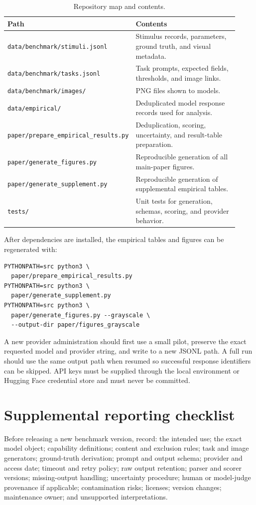 \documentclass[11pt]{article}
\begin{document}
\begin{table}[H]
\centering
\scriptsize
\caption{Repository map and contents.}
\label{tab:supp-repository-map}
\begin{tabular}{p{0.43\linewidth}p{0.49\linewidth}}
\toprule
Path & Contents \\
\midrule
\texttt{data/benchmark/stimuli.jsonl} & Stimulus records, parameters, ground truth, and visual metadata. \\
\texttt{data/benchmark/tasks.jsonl} & Task prompts, expected fields, thresholds, and image links. \\
\texttt{data/benchmark/images/} & PNG files shown to models. \\
\texttt{data/empirical/} & Deduplicated model response records used for analysis. \\
\texttt{paper/prepare\_empirical\_results.py} & Deduplication, scoring, uncertainty, and result-table preparation. \\
\texttt{paper/generate\_figures.py} & Reproducible generation of all main-paper figures. \\
\texttt{paper/generate\_supplement.py} & Reproducible generation of supplemental empirical tables. \\
\texttt{tests/} & Unit tests for generation, schemas, scoring, and provider behavior. \\
\bottomrule
\end{tabular}
\end{table}

After dependencies are installed, the empirical tables and figures can be regenerated with:

\begin{verbatim}
PYTHONPATH=src python3 \
  paper/prepare_empirical_results.py
PYTHONPATH=src python3 \
  paper/generate_supplement.py
PYTHONPATH=src python3 \
  paper/generate_figures.py --grayscale \
  --output-dir paper/figures_grayscale
\end{verbatim}

A new provider administration should first use a small pilot, preserve the exact requested model and provider string, and write to a new JSONL path. A full run should use the same output path when resumed so successful response identifiers can be skipped. API keys must be supplied through the local environment or Hugging Face credential store and must never be committed.

\section{Supplemental reporting checklist}

Before releasing a new benchmark version, record: the intended use; the exact model object; capability definitions; content and exclusion rules; task and image generators; ground-truth derivation; prompt and output schema; provider and access date; timeout and retry policy; raw output retention; parser and scorer versions; missing-output handling; uncertainty procedure; human or model-judge provenance if applicable; contamination risks; licenses; version changes; maintenance owner; and unsupported interpretations.
\end{document}

